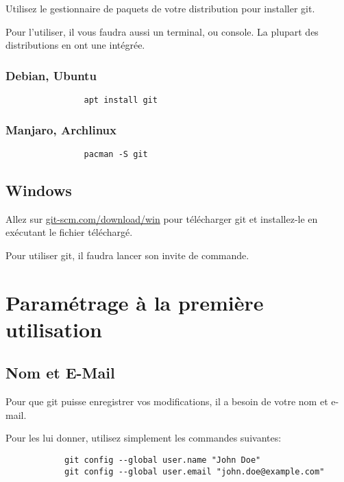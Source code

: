 \documentclass[10pt,a4paper,french]{article}
\begin{document}
        Utilisez le gestionnaire de paquets de votre distribution pour installer git.

        Pour l'utiliser, il vous faudra aussi un terminal, ou console. La plupart des distributions en ont une intégrée.

        \subsubsection{Debian, Ubuntu}

            \begin{verbatim}
                apt install git
            \end{verbatim}

        \subsubsection{Manjaro, Archlinux}

            \begin{verbatim}
                pacman -S git
            \end{verbatim}

    \subsection{Windows}

        Allez sur \href{https://git-scm.com/download/win}{git-scm.com/download/win} pour télécharger git et installez-le en exécutant le fichier téléchargé.

        Pour utiliser git, il faudra lancer son invite de commande.

\section{Paramétrage à la première utilisation}

    \subsection{Nom et E-Mail}

        Pour que git puisse enregistrer vos modifications, il a besoin de votre nom et e-mail.

        Pour les lui donner, utilisez simplement les commandes suivantes:
        \begin{verbatim}
            git config --global user.name "John Doe"
            git config --global user.email "john.doe@example.com"
        \end{verbatim}
\end{document}
